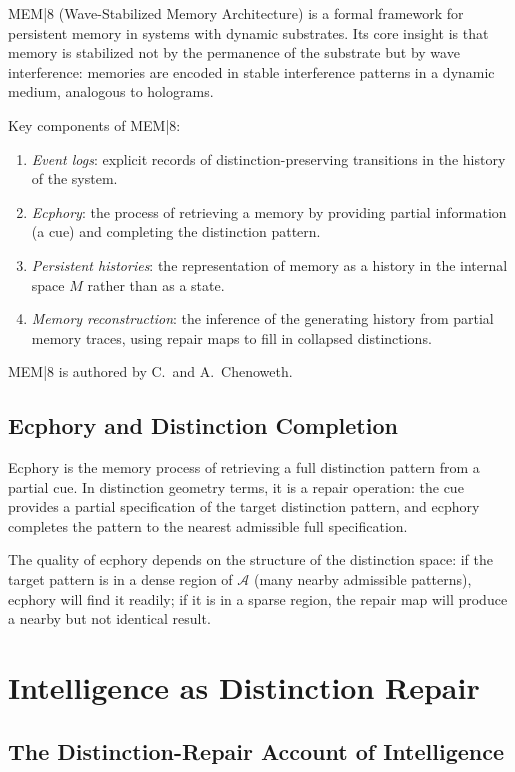\documentclass[12pt,a4paper]{book}
\theoremstyle{remark}
\theoremstyle{definition}
\begin{document}
MEM|8 (Wave-Stabilized Memory Architecture) is a formal framework for
persistent memory in systems with dynamic substrates. Its core insight
is that memory is stabilized not by the permanence of the substrate but
by wave interference: memories are encoded in stable interference patterns
in a dynamic medium, analogous to holograms.

Key components of MEM|8:
\begin{enumerate}[label=(\roman*)]
  \item \emph{Event logs}: explicit records of distinction-preserving
        transitions in the history of the system.
  \item \emph{Ecphory}: the process of retrieving a memory by providing
        partial information (a cue) and completing the distinction pattern.
  \item \emph{Persistent histories}: the representation of memory as a
        history in the internal space $M$ rather than as a state.
  \item \emph{Memory reconstruction}: the inference of the generating
        history from partial memory traces, using repair maps to fill
        in collapsed distinctions.
\end{enumerate}

MEM|8 is authored by C.\ and A.\ Chenoweth.

\section{Ecphory and Distinction Completion}

Ecphory is the memory process of retrieving a full distinction pattern
from a partial cue. In distinction geometry terms, it is a repair
operation: the cue provides a partial specification of the target
distinction pattern, and ecphory completes the pattern to the nearest
admissible full specification.

The quality of ecphory depends on the structure of the distinction space:
if the target pattern is in a dense region of $\mathcal{A}$ (many nearby
admissible patterns), ecphory will find it readily; if it is in a sparse
region, the repair map will produce a nearby but not identical result.

\chapter{Intelligence as Distinction Repair}

\section{The Distinction-Repair Account of Intelligence}
\end{document}
